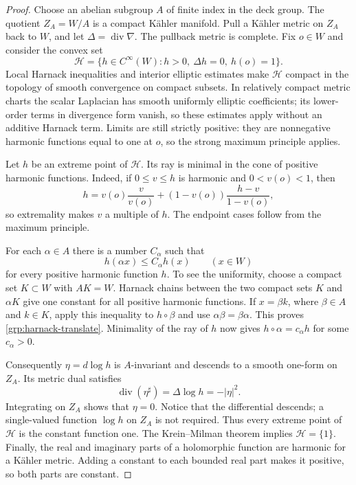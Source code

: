 \begin{proof}
Choose an abelian subgroup $A$ of finite index in the deck group.
The quotient $Z_A=W/A$ is a compact K\"ahler manifold.  Pull a K\"ahler
metric on $Z_A$ back to $W$, and let $\Delta=\operatorname{div}\nabla$.
The pullback metric is complete.  Fix $o\in W$ and consider the convex set
\[
 \mathcal H=\{h\in C^\infty(W):h>0,\ \Delta h=0,\ h(o)=1\}.
\]
Local Harnack inequalities
\cite[Theorems~5--7]{Serrin1964} and interior elliptic estimates
\cite[Lecture~IV, equation~(4.2)$'$ and its consequences]{Nirenberg1959}
make $\mathcal H$ compact in the topology of smooth convergence on
compact subsets. In relatively compact metric charts the scalar
Laplacian has smooth uniformly elliptic coefficients; its lower-order
terms in divergence form vanish, so these estimates apply without
an additive Harnack term.
Limits are still strictly positive: they are nonnegative harmonic
functions equal to one at $o$, so the strong maximum principle applies.

Let $h$ be an extreme point of $\mathcal H$.  Its ray is minimal in the
cone of positive harmonic functions.  Indeed, if $0\leq v\leq h$ is
harmonic and $0<v(o)<1$, then
\[
 h=v(o)\frac{v}{v(o)}+(1-v(o))\frac{h-v}{1-v(o)},
\]
so extremality makes $v$ a multiple of $h$.  The endpoint cases follow
from the maximum principle.

For each $\alpha\in A$ there is a number $C_\alpha$ such that
\begin{equation}\label{grp:harnack-translate}
 h(\alpha x)\leq C_\alpha h(x)\qquad(x\in W)
\end{equation}
for every positive harmonic function $h$.  To see the uniformity, choose
a compact set $K\subset W$ with $AK=W$.  Harnack chains between the two
compact sets $K$ and $\alpha K$ give one constant for all positive
harmonic functions.  If $x=\beta k$, where $\beta\in A$ and $k\in K$,
apply this inequality to $h\circ\beta$ and use
$\alpha\beta=\beta\alpha$.  This proves
\eqref{grp:harnack-translate}.  Minimality of the ray of $h$ now gives
$h\circ\alpha=c_\alpha h$ for some $c_\alpha>0$.

Consequently $\eta=d\log h$ is $A$-invariant and descends to a smooth
one-form on $Z_A$.  Its metric dual satisfies
\[
 \operatorname{div}(\eta^\sharp)
 =\Delta\log h=-|\eta|^2.
\]
Integrating on $Z_A$ shows that $\eta=0$.  Notice that the differential
descends; a single-valued function $\log h$ on $Z_A$ is not required.
Thus every extreme point of $\mathcal H$ is the constant function one.
The Krein--Milman theorem implies $\mathcal H=\{1\}$.
Finally, the real and imaginary parts of a holomorphic function are
harmonic for a K\"ahler metric.  Adding a constant to each bounded real
part makes it positive, so both parts are constant.
\end{proof}

